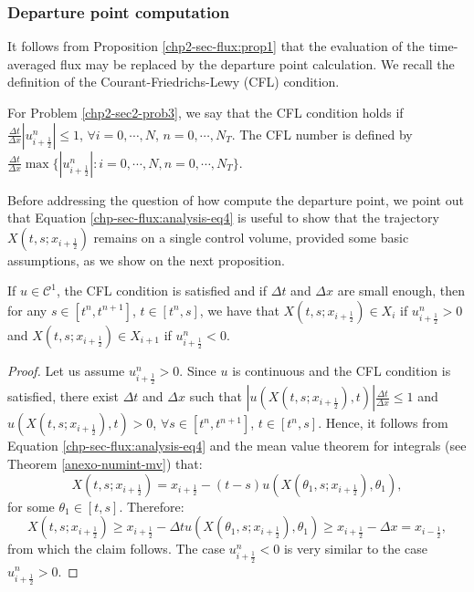 \subsubsection{Departure point computation}
It follows from Proposition \ref{chp2-sec-flux:prop1} that  the evaluation of the time-averaged flux
may be replaced by the departure point calculation.
We recall the definition of the Courant-Friedrichs-Lewy (CFL) condition.
\begin{definition}
	\label{chp2-sec-flux:CFL}
	For Problem \ref{chp2-sec2-prob3}, we say that the CFL condition holds if $\frac{\Delta t}{\Delta x} |u^n_{i+\frac{1}{2}}| \leq 1$, $\forall i=0, \cdots, N$, $n=0,\cdots,N_T$.
	The CFL number is defined by $\frac{\Delta t}{\Delta x} 
	\max \{|u^n_{i+\frac{1}{2}}|: i=0, \cdots, N, n=0, \cdots, N_T\}$.
\end{definition}
Before addressing the question of how compute the departure point, we point out that Equation \eqref{chp-sec-flux:analysis-eq4} is useful to 
show that the trajectory $X(t,s;x_{i+\frac{1}{2}})$ remains on a single control volume,
provided some basic assumptions, as we show on the next proposition.
\begin{prop}
	\label{chp2-sec-flux:departurebound}
	If $u \in \mathcal{C}^1$, the CFL condition is satisfied and if $\Delta t$ and $\Delta x$ are small enough, then
	for any $s \in [t^n, t^{n+1}]$, $t \in [t^n, s]$, we have that $X(t,s;x_{i+\frac{1}{2}}) \in X_i$ if $u_{i+\frac{1}{2}}^n>0$ 
	and	$X(t,s;x_{i+\frac{1}{2}}) \in X_{i+1}$ if $u_{i+\frac{1}{2}}^n<0$.
\end{prop}
\begin{proof}
	Let us assume $u_{i+\frac{1}{2}}^n>0$. Since $u$ is continuous and the CFL condition is satisfied,
	there exist $\Delta t$ and $\Delta x$ such that $|u(X(t,s;x_{i+\frac{1}{2}}),t)| \frac{\Delta t}{\Delta x}\leq1$ and $u(X(t,s;x_{i+\frac{1}{2}}),t)>0$, 
	$\forall s \in [t^n, t^{n+1}]$, $t \in [t^n, s]$.
	Hence, it follows from Equation \eqref{chp-sec-flux:analysis-eq4} and the mean value theorem for integrals
	(see Theorem \ref{anexo-numint-mv}) that:
	\begin{equation*}
		X(t,s;x_{i+\frac{1}{2}}) = x_{i+\frac{1}{2}} - (t-s)u(X(\theta_1,s;x_{i+\frac{1}{2}}),\theta_1),
	\end{equation*}
	for some $\theta_1 \in [t,s]$. Therefore:
	\begin{equation*}
		X(t,s;x_{i+\frac{1}{2}}) \geq x_{i+\frac{1}{2}} - \Delta t u(X(\theta_1,s;x_{i+\frac{1}{2}}),\theta_1)
		\geq x_{i+\frac{1}{2}} - \Delta x = x_{i-\frac{1}{2}},
	\end{equation*}
	from which the claim follows.
	The case $u_{i+\frac{1}{2}}^n<0$  is very similar to the case  $u_{i+\frac{1}{2}}^n>0$.
\end{proof}
